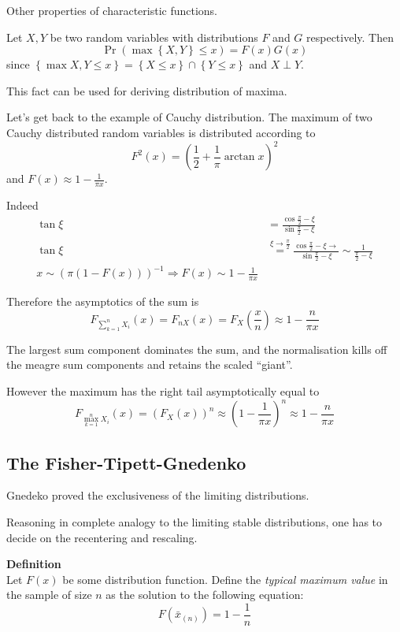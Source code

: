 \documentclass[a4paper]{article}
\newcommand{\obj}[1]{{\left\{ #1 \right \}}}
\newcommand{\brac}[1]{{\left ( #1 \right )}}
\begin{document}
Other properties of characteristic functions.

Let $X,Y$ be two random variables with distributions $F$ and $G$ respectively. Then \[\Pr\brac{\max\obj{X,Y}\leq x} = F(x)G(x)\]
since $\obj{\max{X,Y}\leq x} = \obj{X\leq x}\cap \obj{Y\leq x}$ and $X\perp Y$.

This fact can be used for deriving distribution of maxima.

Let's get back to the example of Cauchy distribution. The maximum of two Cauchy distributed random variables is distributed according to
\[F^2(x) = \brac{\frac{1}{2} + \frac{1}{\pi}\arctan x}^2\]
and $F(x)\approx 1 - \frac{1}{\pi x}$.

Indeed 
\begin{align*}
	\tan \xi
	&= \frac{\cos \frac{\pi}{2} - \xi}{\sin \frac{\pi}{2} - \xi}\\
	\tan \xi &\overset{\xi\to \frac{\pi}{2}}{=} \frac{\cos \frac{\pi}{2} - \xi \to }{\sin \frac{\pi}{2} - \xi}\sim \frac{1}{\frac{\pi}{2} - \xi}\\
	x\sim \brac{\pi\brac{1-F(x)}}^{-1} \Rightarrow F(x)\sim 1-\frac{1}{\pi x}
\end{align*}

Therefore the asymptotics of the sum is
\[F_{\sum_{k=1}^n X_i} (x) = F_{nX}(x) = F_X(\frac{x}{n})\approx 1 - \frac{n}{\pi x}\]

The largest sum component dominates the sum, and the normalisation kills off the meagre sum components and retains the scaled ``giant''.

However the maximum has the right tail asymptotically equal to
\[F_{\max_{k=1}^n X_i} (x) = \brac{F_X(x)}^n \approx \brac{1 - \frac{1}{\pi x}}^n \approx 1 - \frac{n}{\pi x}\]


\subsection{The Fisher-Tipett-Gnedenko} %
\label{sub:the_fisher_tipett}

Gnedeko proved the exclusiveness of the limiting distributions.

Reasoning in complete analogy to the limiting stable distributions, one has to decide on the recentering and rescaling.

\noindent \textbf{Definition}\hfill\\
Let $F(x)$ be some distribution function. Define the \emph{typical maximum value} in the sample of size $n$ as the solution to the following equation: \[F(\bar{x}_{(n)}) = 1-\frac{1}{n}\]
\end{document}
